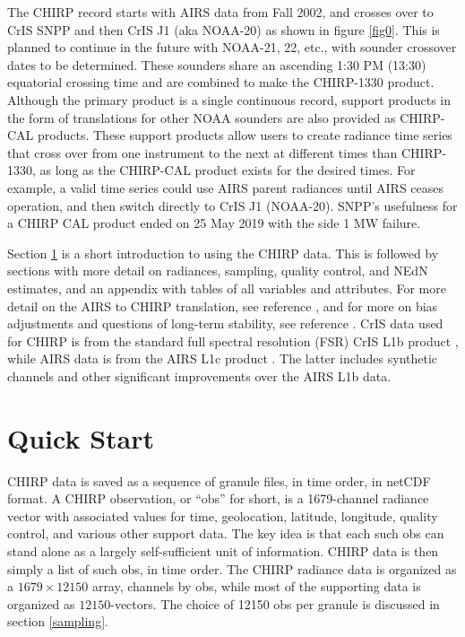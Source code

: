 \documentclass[11pt]{article}
\begin{document}
The CHIRP record starts with AIRS data from Fall 2002, and crosses
over to CrIS SNPP and then CrIS J1 (aka NOAA-20) as shown in figure
\ref{fig0}.  This is planned to continue in the future with NOAA-21,
22, etc., with sounder crossover dates to be determined.  These
sounders share an ascending 1:30 PM (13:30) equatorial crossing time
and are combined to make the CHIRP-1330 product.  Although the
primary product is a single continuous record, support products in
the form of translations for other NOAA sounders are also provided
as CHIRP-CAL products.  These support products allow users to create
radiance time series that cross over from one instrument to the next
at different times than CHIRP-1330, as long as the CHIRP-CAL product
exists for the desired times.  For example, a valid time series
could use AIRS parent radiances until AIRS ceases operation, and
then switch directly to CrIS J1 (NOAA-20).  SNPP's usefulness for a
CHIRP CAL product ended on 25 May 2019 with the side 1 MW failure.

Section \ref{format} is a short introduction to using the CHIRP data.
This is followed by sections with more detail on radiances, sampling,
quality control, and NEdN estimates, and an appendix with tables of
all variables and attributes.  For more detail on the AIRS to CHIRP
translation, see reference \cite{mott2018}, and for more on bias
adjustments and questions of long-term stability, see reference
\cite{strow2021a}.
CrIS data used for CHIRP is from the standard full spectral
resolution (FSR) CrIS L1b product \cite{cris:user2}, while AIRS data
is from the AIRS L1c product \cite{a1c:user}.  The latter includes
synthetic channels and other significant improvements over the AIRS
L1b data.

\section{Quick Start}
\label{format}

CHIRP data is saved as a sequence of granule files, in time order,
in netCDF format.  A CHIRP observation, or ``obs'' for short, is a
1679-channel radiance vector with associated values for time,
geolocation, latitude, longitude, quality control, and various other
support data.  The key idea is that each such obs can stand alone as
a largely self-sufficient unit of information.  CHIRP data is then
simply a list of such obs, in time order.  The CHIRP radiance data
is organized as a $1679 \times 12150$ array, channels by obs, while
most of the supporting data is organized as $12150$-vectors.  The
choice of 12150 obs per granule is discussed in section
\ref{sampling}.
\end{document}
